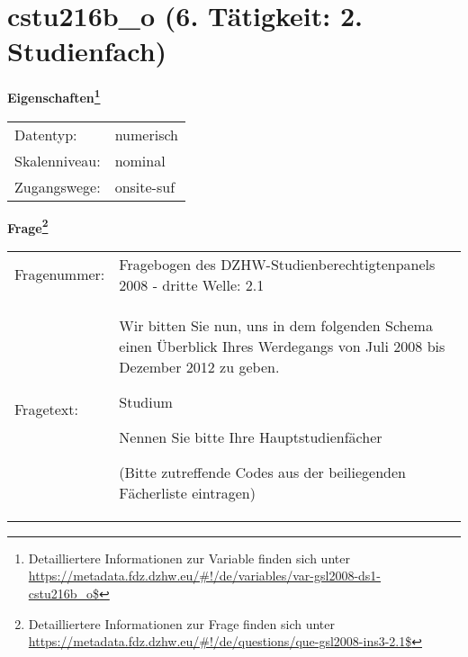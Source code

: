 
    \setcounter{footnote}{0}

    \vspace*{-1.8cm}
	\section{cstu216b\_o (6. Tätigkeit: 2. Studienfach)}
	\label{section:cstu216b_o}



    \vspace*{0.5cm}
    \noindent\textbf{Eigenschaften\footnote{Detailliertere Informationen zur Variable finden sich unter
		\url{https://metadata.fdz.dzhw.eu/\#!/de/variables/var-gsl2008-ds1-cstu216b_o$}}}\\
	\begin{tabularx}{\hsize}{@{}lX}
	Datentyp: & numerisch \\
	Skalenniveau: & nominal \\
	Zugangswege: &
	  onsite-suf
 \\
    \end{tabularx}



				\vspace*{0.5cm}
                \noindent\textbf{Frage\footnote{Detailliertere Informationen zur Frage finden sich unter
		              \url{https://metadata.fdz.dzhw.eu/\#!/de/questions/que-gsl2008-ins3-2.1$}}}\\
				\begin{tabularx}{\hsize}{@{}lX}
					Fragenummer: &
					  Fragebogen des DZHW-Studienberechtigtenpanels 2008 - dritte Welle:
					  2.1
 \\
					Fragetext: & Wir bitten Sie nun, uns in dem folgenden Schema einen Überblick Ihres Werdegangs von Juli 2008 bis Dezember 2012 zu geben.\par  Studium\par  Nennen Sie bitte Ihre Hauptstudienfächer\par  (Bitte zutreffende Codes aus der beiliegenden Fächerliste eintragen) \\
				\end{tabularx}






